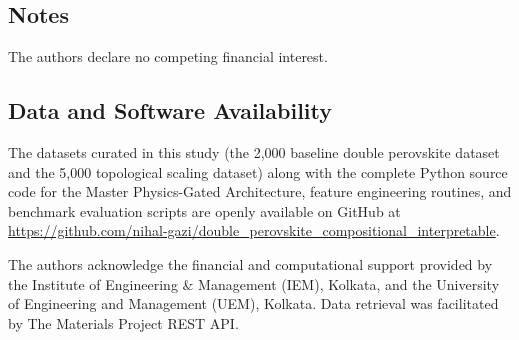 \documentclass[journal=jcisd8,manuscript=article]{achemso}
\begin{document}
\subsection*{Notes}
The authors declare no competing financial interest.

\subsection*{Data and Software Availability}
The datasets curated in this study (the 2,000 baseline double perovskite dataset and the 5,000 topological scaling dataset) along with the complete Python source code for the Master Physics-Gated Architecture, feature engineering routines, and benchmark evaluation scripts are openly available on GitHub at \url{https://github.com/nihal-gazi/double_perovskite_compositional_interpretable}.

\begin{acknowledgement}
The authors acknowledge the financial and computational support provided by the Institute of Engineering \& Management (IEM), Kolkata, and the University of Engineering and Management (UEM), Kolkata. Data retrieval was facilitated by The Materials Project REST API.
\end{acknowledgement}


\end{document}
